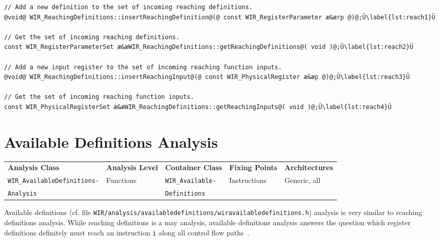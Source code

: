 \begin{lstlisting}[style=code,float=ht,caption={Reaching Definitions and Inputs Handling of Container Class \texttt{WIR\_ReachingDefinitions}},label=lst:reach]
// Add a new definition to the set of incoming reaching definitions.
@void@ WIR_ReachingDefinitions::insertReachingDefinition@(@ const WIR_RegisterParameter æ&ærp @)@;Ü\label{lst:reach1}Ü

// Get the set of incoming reaching definitions.
const WIR_RegisterParameterSet æ&æWIR_ReachingDefinitions::getReachingDefinitions@( void )@;Ü\label{lst:reach2}Ü

// Add a new input register to the set of incoming reaching function inputs.
@void@ WIR_ReachingDefinitions::insertReachingInput@(@ const WIR_PhysicalRegister æ&æp @)@;Ü\label{lst:reach3}Ü

// Get the set of incoming reaching function inputs.
const WIR_PhysicalRegisterSet æ&æWIR_ReachingDefinitions::getReachingInputs@( void )@;Ü\label{lst:reach4}Ü
\end{lstlisting}


\section{Available Definitions Analysis}
\label{sec:availdef}

\begin{tabular}{|l|l|l|l|l|}
  \hline
  \textbf{Analysis Class} & \textbf{Analysis Level} & \textbf{Container Class} & \textbf{Fixing Points} & \textbf{Architectures} \\
  \hhline{|=|=|=|=|=|}
  \texttt{\small WIR\_AvailableDefinitions-} & Functions & \texttt{\small WIR\_Available-} & Instructions & Generic, all \\
  \texttt{\small Analysis} & & \texttt{\small Definitions} & & \\
  \hline
\end{tabular}

Available definitions (cf. file \texttt{WIR/analysis/availabledefinitions/wiravailabledefinitions.h}) analysis is very similar to reaching definitions analysis.
While reaching definitions is a may analysis, available definitions analysis answers the question which register definitions definitely must reach an instruction \texttt{i} along all control flow paths~\cite[chapter~17.2]{Appel04}.

